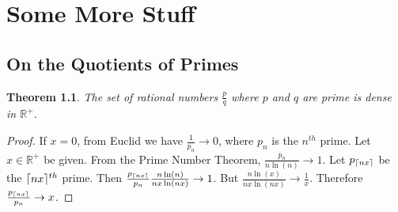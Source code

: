 \documentclass[crop=false,class=book]{standalone}
\theoremstyle{mystyle}
\newtheorem{theorem}{Theorem}[section]
\DeclarePairedDelimiter\ceil{\lceil}{\rceil}
\begin{document}
\chapter{Some More Stuff}
\section{On the Quotients of Primes}
\begin{theorem}
The set of rational numbers $\frac{p}{q}$ where $p$ and $q$ are prime is dense in $\mathbb{R}^{+}$.
\end{theorem}
\begin{proof}
If $x=0$, from Euclid we have $\frac{1}{p_n}\rightarrow 0$, where $p_n$ is the $n^{th}$ prime. Let $x\in\mathbb{R}^{+}$ be given. From the Prime Number Theorem, $\frac{p_n}{n\ln(n)}\rightarrow 1$. Let $p_{\ceil{nx}}$ be the $\ceil{nx}^{th}$ prime. Then $\frac{p_{\ceil{nx}}}{p_n}\frac{n\ln(n)}{nx\ln(nx)}\rightarrow 1$. But $\frac{n\ln(x)}{nx\ln(nx)}\rightarrow \frac{1}{x}$. Therefore $\frac{p_{\ceil{nx}}}{p_n}\rightarrow x$.
\end{proof}
\end{document}
